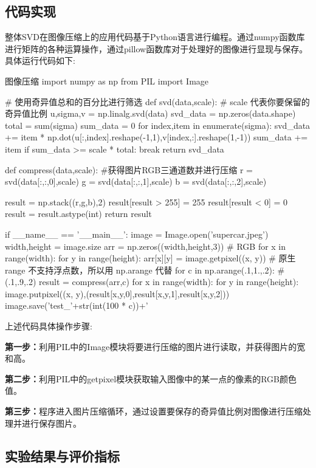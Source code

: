 \documentclass{hfutpaper}
\begin{document}
	\subsection{代码实现}
	整体SVD在图像压缩上的应用代码基于Python语言进行编程。通过numpy函数库进行矩阵的各种运算操作，通过pillow函数库对于处理好的图像进行显现与保存。具体运行代码如下:
	\begin{Python}{图像压缩}
import numpy as np
from PIL import Image

# 使用奇异值总和的百分比进行筛选
def svd(data,scale):
# scale 代表你要保留的奇异值比例
	u,sigma,v = np.linalg.svd(data)
	svd_data = np.zeros(data.shape)
	total = sum(sigma)
	sum_data = 0
	for index,item in enumerate(sigma):  
		svd_data += item * np.dot(u[:,index].reshape(-1,1),v[index,:].reshape(1,-1))
		sum_data += item
		if sum_data >= scale * total:
			break
	return svd_data

def compress(data,scale):
#获得图片RGB三通道数并进行压缩
	r = svd(data[:,:,0],scale)
	g = svd(data[:,:,1],scale)
	b = svd(data[:,:,2],scale)
	
	result = np.stack((r,g,b),2)
	result[result > 255] = 255
	result[result < 0] = 0
	result = result.astype(int)
	return result

if __name__ == '__main__':
	image = Image.open('supercar.jpeg')
	width,height = image.size
	arr = np.zeros((width,height,3)) # RGB 
	for x in range(width):
		for y in range(height):
			arr[x][y] = image.getpixel((x, y))
	# 原生 range 不支持浮点数，所以用 np.arange 代替
	for c in np.arange(.1,1.,.2): #(.1,.9,.2)
		result = compress(arr,c)
		for x in range(width):
			for y in range(height):
				image.putpixel((x, y),(result[x,y,0],result[x,y,1],result[x,y,2]))
		image.save('test_'+str(int(100 * c))+'%

	\end{Python}
上述代码具体操作步骤:

\textbf{第一步：}利用PIL中的Image模块将要进行压缩的图片进行读取，并获得图片的宽和高。

\textbf{第二步：}利用PIL中的getpixel模块获取输入图像中的某一点的像素的RGB颜色值。

\textbf{第三步：}程序进入图片压缩循环，通过设置要保存的奇异值比例对图像进行压缩处理并进行保存图片。

	\subsection{实验结果与评价指标}
\end{document}

